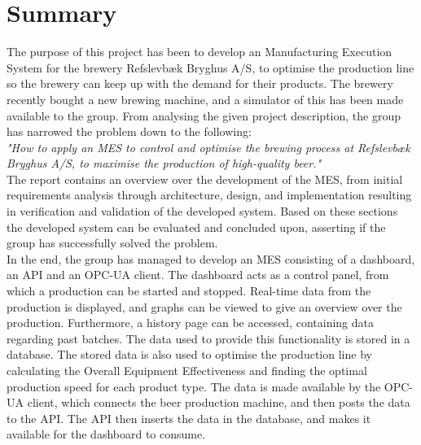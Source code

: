 \section{Summary}
The purpose of this project has been to develop an Manufacturing Execution
System for the brewery Refslevbæk Bryghus A/S, to optimise the production line
so the brewery can keep up with the demand for their products. The brewery
recently bought a new brewing machine, and a simulator of this has been made
available to the group. From analysing the given project description, the group
has narrowed the problem down to the following:\\

\textit{"How to apply an MES to control and optimise the brewing process at
Refslevbæk Bryghus A/S, to maximise the production of high-quality beer."}\\

The report contains an overview over the development of the MES, from initial
requirements analysis through architecture, design, and implementation resulting
in verification and validation of the developed system. Based on these sections
the developed system can be evaluated and concluded upon, asserting if the
group has successfully solved the problem.\\

In the end, the group has managed to develop an MES consisting of a dashboard,
an API and an OPC-UA client. The dashboard acts as a control panel, from which a
production can be started and stopped. Real-time data from the production is
displayed, and graphs can be viewed to give an overview over the production.
Furthermore, a history page can be accessed, containing data regarding past
batches. The data used to provide this functionality is stored in a database.
The stored data is also used to optimise the production line by calculating the
Overall Equipment Effectiveness and finding the optimal production speed for
each product type. The data is made available by the OPC-UA client, which
connects the beer production machine, and then posts the data to the API. The
API then inserts the data in the database, and makes it available for the
dashboard to consume.